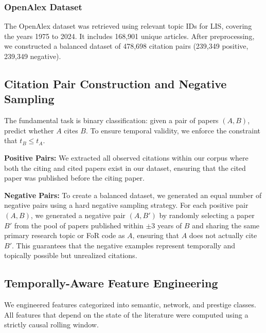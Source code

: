 \documentclass[12pt,a4paper]{article}
\begin{document}
\subsubsection{OpenAlex Dataset}
The OpenAlex dataset was retrieved using relevant topic IDs for LIS, covering the years 1975 to 2024. It includes 168,901 unique articles. After preprocessing, we constructed a balanced dataset of 478,698 citation pairs (239,349 positive, 239,349 negative).

\subsection{Citation Pair Construction and Negative Sampling}
The fundamental task is binary classification: given a pair of papers $(A, B)$, predict whether $A$ cites $B$. To ensure temporal validity, we enforce the constraint that $t_B \le t_A$.

\textbf{Positive Pairs:} We extracted all observed citations within our corpus where both the citing and cited papers exist in our dataset, ensuring that the cited paper was published before the citing paper.

\textbf{Negative Pairs:} To create a balanced dataset, we generated an equal number of negative pairs using a hard negative sampling strategy. For each positive pair $(A, B)$, we generated a negative pair $(A, B')$ by randomly selecting a paper $B'$ from the pool of papers published within $\pm 3$ years of $B$ and sharing the same primary research topic or FoR code as $A$, ensuring that $A$ does not actually cite $B'$. This guarantees that the negative examples represent temporally and topically possible but unrealized citations.

\subsection{Temporally-Aware Feature Engineering}
We engineered features categorized into semantic, network, and prestige classes. All features that depend on the state of the literature were computed using a strictly causal rolling window.
\end{document}
